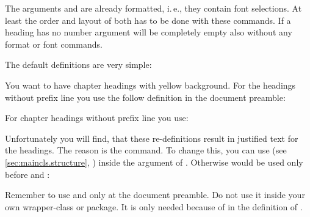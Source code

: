 The arguments  and  are already formatted, i.\,e.,
they contain font selections. At least the order and layout of both has to be
done with these commands. If a heading has no number argument 
will be completely empty also without any format or font commands.

The default definitions are very simple:
\begin{lstcode}[belowskip=\dp\strutbox plus 1pt]
  \newcommand{\chapterlinesformat}[3]{%
    \@hangfrom{#2}{#3}%
  }
  \newcommand{\chapterlineswithprefixformat}[3]{%
    #2#3%
  }
\end{lstcode}

\begin{Example}
  You want to have chapter headings with yellow background. For the headings
  without prefix line you use the follow definition in the document preamble:
\begin{lstcode}
  \makeatletter
  \renewcommand{\chapterlinesformat}[3]{%
    \colorbox{yellow}{%
      \parbox{\dimexpr\linewidth-2\fboxrule-2\fboxsep}{%
        \@hangfrom{#2}#3%
      }%
    }%
  }
  \makeatother
\end{lstcode}
  For chapter headings without prefix line you use:
\begin{lstcode}
  \renewcommand{\chapterlineswithprefixformat}[3]{%
    \colorbox{yellow}{%
      \parbox{\dimexpr\linewidth-2\fboxrule-2\fboxsep}{%
        #2#3%
      }%
    }%
  }
\end{lstcode}
  Unfortunately you will find, that these re-definitions result in justified
  text for the headings. The reason is the  command. To change
  this, you can use  (see \autoref{sec:maincls.structure},
  ) inside the argument of
  . Otherwise  would be used only before
   and :
\begin{lstcode}
  \makeatletter
  \renewcommand{\chapterlinesformat}[3]{%
    \colorbox{yellow}{%
      \parbox{\dimexpr\linewidth-2\fboxrule-2\fboxsep}{%
        \raggedchapter
        \@hangfrom{#2}#3%
      }%
    }%
  }
  \makeatother
  \renewcommand{\chapterlineswithprefixformat}[3]{%
    \colorbox{yellow}{%
      \parbox{\dimexpr\linewidth-2\fboxrule-2\fboxsep}{%
        \raggedchapter
        #2#3%
      }%
    }%
  }
\end{lstcode}
  Remember to use  and  only at the
  document preamble. Do not use it inside your own wrapper-class or
  package. It is only needed because of  in the definition of
  .
\end{Example}

